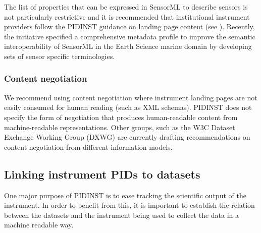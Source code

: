 \documentclass[a4paper,10pt,english]{sphinxmanual}
\begin{document}
The list of properties that can be expressed in SensorML to describe
sensors is not particularly restrictive and it is recommended that
institutional instrument providers follow the PIDINST guidance on
landing page content (see {\hyperref[\detokenize{white-paper/landing-page-content:landing-page-content}]{}}).  Recently, the
 initiative specified a comprehensive metadata
profile to improve the semantic interoperability of SensorML in the
Earth Science marine domain by developing sets of sensor specific
terminologies.


\subsubsection{Content negotiation}
\label{\detokenize{white-paper/landing-page-encoding:content-negotiation}}
We recommend using content negotiation where instrument landing pages
are not easily consumed for human reading (such as XML schemas). PIDINST
does not specify the form of negotiation that produces human-readable
content from machine-readable representations. Other groups, such as the
W3C Dataset Exchange Working Group (DXWG) are currently drafting
recommendations on content negotiation from different information
models.%
\begin{footnote}[2]\sphinxAtStartFootnote
{}
%
\end{footnote}


\subsection{Linking instrument PIDs to datasets}
\label{\detokenize{white-paper/linking-datasets:linking-instrument-pids-to-datasets}}\label{\detokenize{white-paper/linking-datasets::doc}}
One major purpose of PIDINST is to ease tracking the scientific output
of the instrument.  In order to benefit from this, it is important to
establish the relation between the datasets and the instrument being
used to collect the data in a machine readable way.
\end{document}
